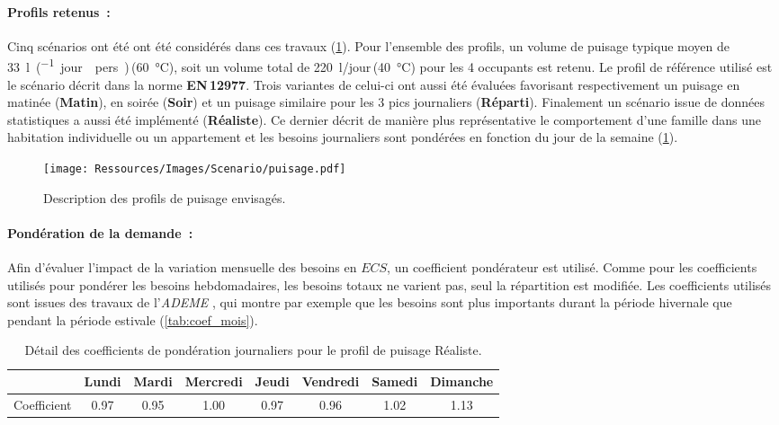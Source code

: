 \paragraph{Profils retenus~:} %
\label{par:profils_retenus}
Cinq scénarios ont été ont été considérés dans ces travaux (\ref{fig:profil_puisage}).
Pour l’ensemble des profils, un volume de puisage typique moyen de
\SI{33}{\litre\per(jour\period pers)}\,(\SI{60}{\celsius}), soit un
volume total de \SI{220}{\litre/jour}\,(\SI{40}{\celsius}) pour les 4 occupants est
retenu. Le profil de référence utilisé est le scénario décrit dans la norme
\textbf{EN\,12977}. Trois variantes de celui-ci ont aussi été évaluées favorisant
respectivement un puisage en matinée (\textbf{Matin}), en soirée (\textbf{Soir}) et un
puisage similaire pour les 3 pics journaliers (\textbf{Réparti}). Finalement un scénario
issue de données statistiques \parencite{ADEME2016} a aussi été implémenté
(\textbf{Réaliste}). Ce dernier décrit de manière plus représentative le comportement
d’une famille dans une habitation individuelle ou un appartement et les besoins
journaliers sont pondérées en fonction du jour de la semaine (\ref{tab:coef_semaine}).
\begin{figure}
    \begin{center}
        \texttt{[image: Ressources/Images/Scenario/puisage.pdf]}
    \end{center}
    \caption{Description des profils de puisage envisagés.
             \label{fig:profil_puisage}}
\end{figure}

\paragraph{Pondération de la demande~:} %
\label{par:ponderation_de_la_demande}
Afin d’évaluer l’impact de la variation mensuelle des besoins en $ECS$, un
coefficient pondérateur est utilisé. Comme pour les coefficients utilisés pour pondérer
les besoins hebdomadaires, les besoins totaux ne varient pas, seul la répartition est
modifiée. Les coefficients utilisés sont issues des travaux de l’\emph{ADEME}
\parencite{ADEME2016}, qui montre par exemple que les besoins sont plus importants durant
la période hivernale que pendant la période estivale (\ref{tab:coef_mois}).

\begin{table}
\centering
\begin{tabular}{l*{7}{c}}
    \toprule
                & Lundi & Mardi & Mercredi & Jeudi & Vendredi & Samedi & Dimanche \\
    \midrule
    Coefficient & \num{0.97}  & \num{0.95}  & \num{1.00}     & \num{0.97}  & \num{0.96}     & \num{1.02}   & \num{1.13}     \\
    \bottomrule
\end{tabular}
\caption{Détail des coefficients de pondération journaliers pour le profil de
         puisage Réaliste.}
         \label{tab:coef_semaine}
\end{table}

